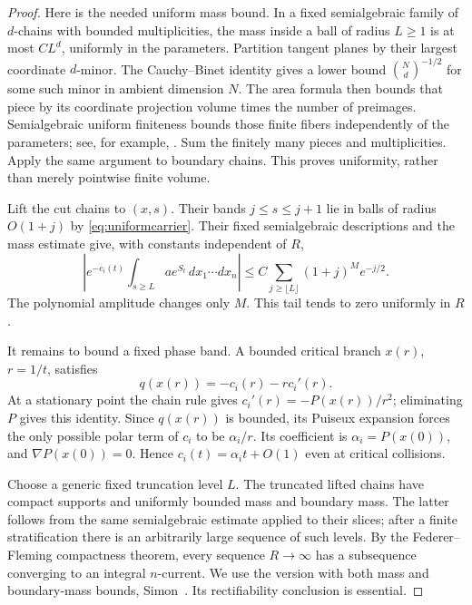 \begin{proof}
Here is the needed uniform mass bound. In a fixed semialgebraic
family of $d$-chains with bounded multiplicities, the mass inside
a ball of radius $L\ge1$ is at most $C L^d$, uniformly in the
parameters. Partition tangent planes by their largest coordinate
$d$-minor. The Cauchy--Binet identity gives a lower bound
$\binom Nd^{-1/2}$ for some such minor in ambient dimension $N$.
The area formula then bounds that piece by its coordinate
projection volume times the number of preimages. Semialgebraic
uniform finiteness bounds those finite fibers independently of
the parameters; see, for example,
\cite[Theorem~2.32]{DrusvyatskiyLewis}. Sum the finitely many
pieces and multiplicities. Apply the same argument to boundary
chains. This proves uniformity, rather than merely pointwise
finite volume.

Lift the cut chains to $(x,s)$. Their bands $j\le s\le j+1$
lie in balls of radius $O(1+j)$ by
\eqref{eq:uniformcarrier}. Their fixed semialgebraic descriptions
and the mass estimate give, with constants independent of $R$,
\begin{equation}\label{eq:uniformcuttail}
 \left|e^{-c_i(t)}\int_{s\ge L}a e^{S_t}\,dx_1\cdots dx_n\right|
 \le C\sum_{j\ge\lfloor L\rfloor}(1+j)^M e^{-j/2}.
\end{equation}
The polynomial amplitude changes only $M$. This tail tends to
zero uniformly in $R$.

It remains to bound a fixed phase band. A bounded critical branch
$x(r)$, $r=1/t$, satisfies
\[
 q(x(r))=-c_i(r)-r c_i'(r).
\]
At a stationary point the chain rule gives $c_i'(r)=-P(x(r))/r^2$;
eliminating $P$ gives this identity. Since $q(x(r))$ is
bounded, its Puiseux expansion forces the only possible polar
term of $c_i$ to be $\alpha_i/r$. Its coefficient is
$\alpha_i=P(x(0))$, and $\nabla P(x(0))=0$. Hence
$c_i(t)=\alpha_i t+O(1)$ even at critical collisions.

Choose a generic fixed truncation level $L$. The truncated lifted
chains have compact supports and uniformly bounded mass and
boundary mass. The latter follows from the same semialgebraic
estimate applied to their slices; after a finite stratification
there is an arbitrarily large sequence of such levels. By the
Federer--Fleming compactness theorem, every sequence $R\to\infty$
has a subsequence converging to an integral $n$-current. We use
the version with both mass and boundary-mass bounds,
Simon~\cite[Chapter~6, Section~3, Theorem~3.15]{SimonGMT}.
Its rectifiability conclusion is essential.


\end{proof}
